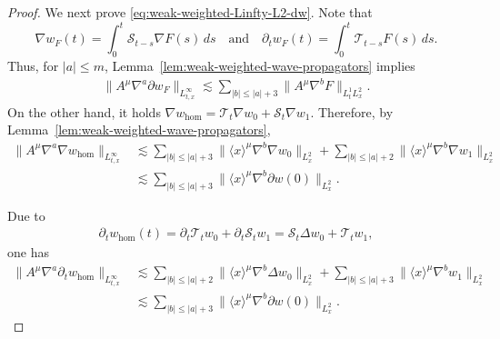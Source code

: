 \documentclass[11pt,twoside]{article}
\def\ls{\lesssim}
\theoremstyle{plain}
\theoremstyle{definition}
\theoremstyle{assumption}
\numberwithin{equation}{section}
\begin{document}
\begin{proof}
				We next prove \eqref{eq:weak-weighted-Linfty-L2-dw}. Note that
				\begin{equation*}
					\nabla w_F(t)
					=\int_0^t
					\mathcal S_{t-s}\nabla F(s)\,ds
				\quad\text{and}\quad
				\partial_t w_F(t)
					=\int_0^t \mathcal T_{t-s}F(s)\,ds.
				\end{equation*}
				Thus, for \(|a|\le m\), Lemma~\ref{lem:weak-weighted-wave-propagators} implies
				\begin{equation}
					\label{eq:weak-Duhamel-dw}
					\begin{aligned}
						\|A^\mu\nabla^a\partial w_F\|_{L^\infty_{t,x}}
						\ls
						\sum_{|b|\le |a|+3}
						\|A^\mu\nabla^bF\|_{L^1_tL^2_x}.
					\end{aligned}
				\end{equation}
				On the other hand, it holds $\nabla w_{\mathrm{hom}}
					=\mathcal T_t\nabla w_0+\mathcal S_t\nabla w_1$.
				Therefore, by Lemma~\ref{lem:weak-weighted-wave-propagators},
				\begin{equation}
					\label{eq:weak-homogeneous-space-dw}
					\begin{aligned}
						\|A^\mu\nabla^a\nabla w_{\mathrm{hom}}\|_{L^\infty_{t,x}}
						&\ls
						\sum_{|b|\le |a|+3}
						\|\langle x\rangle^\mu\nabla^b\nabla w_0\|_{L^2_x}
						+
						\sum_{|b|\le |a|+2}
						\|\langle x\rangle^\mu\nabla^b\nabla w_1\|_{L^2_x}
						\\
						&\ls
						\sum_{|b|\le |a|+3}
						\|\langle x\rangle^\mu\nabla^b\partial w(0)\|_{L^2_x}.
					\end{aligned}
				\end{equation}
				
				Due to
				\begin{equation}
					\label{eq:weak-homogeneous-time-identity}
					\begin{aligned}
						\partial_t w_{\mathrm{hom}}(t)
						=
						\partial_t\mathcal T_t w_0
						+
						\partial_t\mathcal S_t w_1
						=
						\mathcal S_t\Delta w_0+\mathcal T_t w_1,
					\end{aligned}
				\end{equation}
				one has
				\begin{equation}
					\label{eq:weak-homogeneous-time-dw}
					\begin{aligned}
						\|A^\mu\nabla^a\partial_t w_{\mathrm{hom}}\|_{L^\infty_{t,x}}
						&\ls
						\sum_{|b|\le |a|+2}
						\|\langle x\rangle^\mu\nabla^b\Delta w_0\|_{L^2_x}
						+
						\sum_{|b|\le |a|+3}
						\|\langle x\rangle^\mu\nabla^b w_1\|_{L^2_x}
						\\
						&\ls
						\sum_{|b|\le |a|+3}
						\|\langle x\rangle^\mu\nabla^b\partial w(0)\|_{L^2_x}.
					\end{aligned}
				\end{equation}
				

\end{proof}
\end{document}
